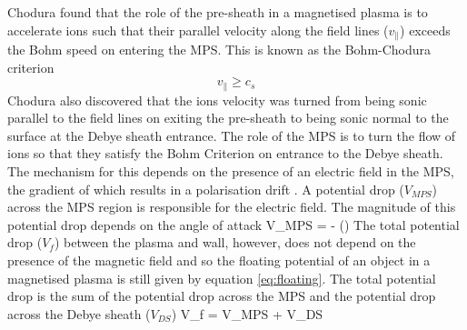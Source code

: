 Chodura found that the role of the pre-sheath in a magnetised plasma is to accelerate ions such that their parallel velocity along the field lines ($v_{\parallel}$) exceeds the Bohm speed on entering the MPS. This is known as the Bohm-Chodura criterion 
\begin{equation}
v_{\parallel} \geq c_s
\end{equation}
Chodura also discovered that the ions velocity was turned from being sonic parallel to the field lines on exiting the pre-sheath to being sonic normal to the surface at the Debye sheath entrance. The role of the MPS is to turn the flow of ions so that they satisfy the Bohm Criterion on entrance to the Debye sheath. The mechanism for this depends on the presence of an electric field in the MPS, the gradient of which results in a polarisation drift \cite{MPS_polarisation}. A potential drop ($V_{MPS}$) across the MPS region is responsible for the electric field. The magnitude of this potential drop depends on the angle of attack \cite{stangeby-angles}
\be 
V_{MPS} = - \ln(\sin\alpha) 
\ee  
The total potential drop ($V_f$) between the plasma and wall, however,  does not depend on the presence of the magnetic field and so the floating potential of an object in a magnetised plasma is still given by equation  \ref{eq:floating}. The total potential drop is the sum of the potential drop across the MPS and the potential drop across the Debye sheath ($V_{DS}$)
\be
V_f = V_{MPS} + V_{DS}
\ee

